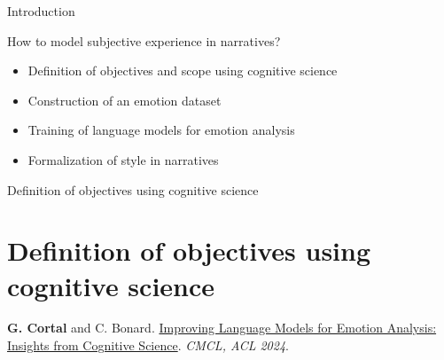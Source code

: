\documentclass[handout,10pt]{beamer}
\begin{document}
\begin{frame}{Introduction}




\pause


How to model subjective experience in narratives?


\vspace{0.5cm}
\pause


\begin{itemize}[<+->]
    \item Definition of objectives and scope using cognitive science
    \item Construction of an emotion dataset 
    \item Training of language models for emotion analysis 
    \item Formalization of style in narratives 
\end{itemize}




    
\end{frame}

\begin{frame}{}
\Large
\begin{center}
    Definition of objectives using cognitive science
    \section{Definition of objectives using cognitive science}
\end{center}
\vspace{1.5cm}

    \footnotesize

    \textbf{G. Cortal} and C. Bonard. \href{https://aclanthology.org/2024.cmcl-1.23/}{Improving Language Models for Emotion Analysis: Insights from Cognitive Science}. \textit{CMCL, ACL 2024}.
\end{frame}
\end{document}
